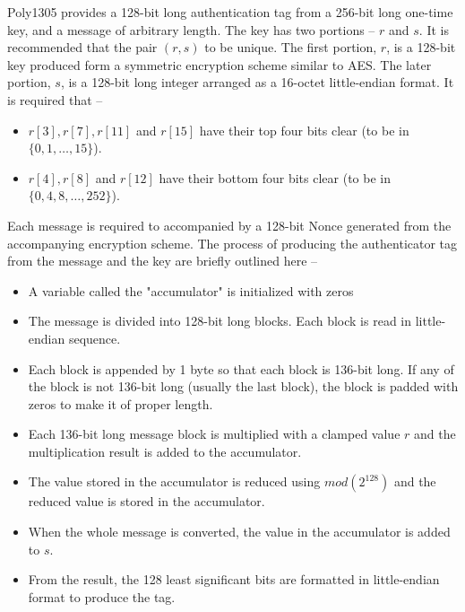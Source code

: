 \documentclass{article}
\begin{document}
Poly1305 provides a 128-bit long authentication tag from a 256-bit long one-time key, and a message of arbitrary length. The key has two portions -- $r$ and $s$. It is recommended that the pair $(r,s)$ to be unique. The first portion, $r$, is a 128-bit key produced form a symmetric encryption scheme similar to AES. The later portion, $s$, is a 128-bit long integer arranged as a 16-octet little-endian format. It is required that --
\begin{itemize}
    \item $r[3], r[7], r[11]$ and $r[15]$ have their top four bits clear (to be in $\{0,1,\ldots,15\}$).
    \item $r[4], r[8]$ and $r[12]$ have their bottom four bits clear (to be in $\{0,4,8,\ldots,252\}$).
\end{itemize}

Each message is required to accompanied by a 128-bit Nonce generated from the accompanying encryption scheme. The process of producing the authenticator tag from the message and the key are briefly outlined here --
\begin{itemize}
    \item A variable called the "accumulator" is initialized with zeros
    \item The message is divided into 128-bit long blocks. Each block is read in little-endian sequence.
    \item Each block is appended by 1 byte so that each block is 136-bit long. If any of the block is not 136-bit long (usually the last block), the block is padded with zeros to make it of proper length.
    \item Each 136-bit long message block is multiplied with a clamped value $r$ and the multiplication result is added to the accumulator.
    \item The value stored in the accumulator is reduced using $mod(2^{128})$ and the reduced value is stored in the accumulator.
    \item When the whole message is converted, the value in the accumulator is added to $s$.
    \item From the result, the 128 least significant bits are formatted in little-endian format to produce the tag.
\end{itemize}
\end{document}
